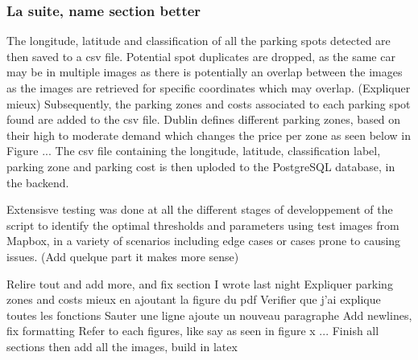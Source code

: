 \subsubsection{La suite, name section better}
The longitude, latitude and classification of all the parking spots detected are then saved to a csv file.
Potential spot duplicates are dropped, as the same car may be in multiple images as there is potentially an overlap between the images as the images are retrieved for specific coordinates which may overlap. (Expliquer mieux)
Subsequently, the parking zones and costs associated to each parking spot found are added to the csv file.
Dublin defines different parking zones, based on their high to moderate demand which changes the price per zone as seen below in Figure ...
The csv file containing the longitude, latitude, classification label, parking zone and parking cost is then uploded to the PostgreSQL database, in the backend.

Extensisve testing was done at all the different stages of developpement of the script to identify the optimal thresholds and parameters using test images from Mapbox, in a variety of scenarios including edge cases or cases prone to causing issues. (Add quelque part it makes more sense)

Relire tout and add more, and fix section I wrote last night
Expliquer parking zones and costs mieux en ajoutant la figure du pdf
Verifier que j'ai explique toutes les fonctions
Sauter une ligne ajoute un nouveau paragraphe
Add newlines, fix formatting
Refer to each figures, like say as seen in figure x ...
Finish all sections then add all the images, build in latex